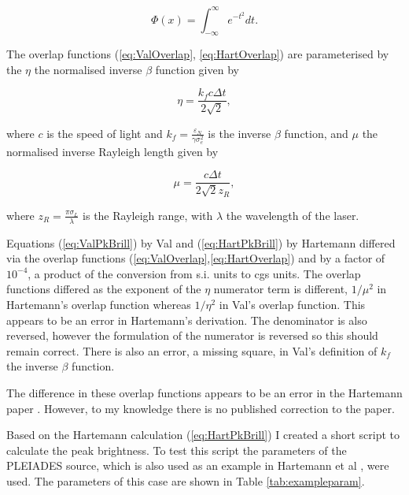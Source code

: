 \documentclass[10pt]{article}
\begin{document}
\begin{equation}
\Phi\left(x\right) = \int_{-\infty}^{\infty} e^{-t^{2}} dt.
\label{eq:errfunc}
\end{equation}  


The overlap functions (\ref{eq:ValOverlap}, \ref{eq:HartOverlap}) are parameterised by the $\eta$ the normalised inverse $\beta$ function given by

\begin{equation}
\eta = \frac{k_{f}c\Delta t}{2\sqrt{2}},
\label{eq:etaparam}
\end{equation}

where $c$ is the speed of light and $k_{f} = \frac{\varepsilon_{N}}{\gamma\sigma_{e}^{2}}$ is the inverse $\beta$ function, and $\mu$ the normalised inverse Rayleigh length given by

\begin{equation}
\mu = \frac{c \Delta t}{2\sqrt{2} z_{R}},
\label{eq:muparam}
\end{equation}
 
where $z_{R} = \frac{\pi\sigma_{L}}{\lambda}$ is the Rayleigh range, with $\lambda$ the wavelength of the laser.

Equations (\ref{eq:ValPkBrill}) by Val and (\ref{eq:HartPkBrill}) by Hartemann differed via the overlap functions (\ref{eq:ValOverlap},\ref{eq:HartOverlap}) and by a factor of $10^{-4}$, a product of the conversion from s.i. units to cgs units. The overlap functions differed as the exponent of the $\eta$ numerator term is different, $1/\mu^{2}$ in Hartemann's overlap function whereas $1/\eta^{2}$ in Val's overlap function. This appears to be an error in Hartemann's derivation. The denominator is also reversed, however the formulation of the numerator is reversed so this should remain correct. There is also an error, a missing square, in Val's definition of $k_{f}$ the inverse $\beta$ function. 

The difference in these overlap functions appears to be an error in the Hartemann paper \cite{hartemann2005high}. However, to my knowledge there is no published correction to the paper.

Based on the Hartemann calculation (\ref{eq:HartPkBrill}) I created a short script to calculate the peak brightness. To test this script the parameters of the PLEIADES source, which is also used as an example in Hartemann et al \cite{hartemann2005high}, were used. The parameters of this case are shown in Table \ref{tab:exampleparam}.
\end{document}
